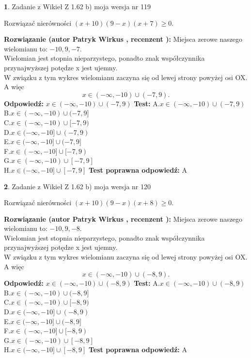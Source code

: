 \documentclass[12pt, a4paper]{article}
\theoremstyle{definition} %
\newtheorem{zad}{}
\newcommand{\zadStart}[1]{\begin{zad}#1\newline}
\newcommand{\zadStop}{\end{zad}}
\newcommand{\rozwStart}[2]{\noindent \textbf{Rozwiązanie (autor #1 , recenzent #2): }\newline}
\newcommand{\rozwStop}{\newline}
\newcommand{\odpStart}{\noindent \textbf{Odpowiedź:}\newline}
\newcommand{\odpStop}{\newline}
\newcommand{\testStart}{\noindent \textbf{Test:}\newline}
\newcommand{\testStop}{\newline}
\newcommand{\kluczStart}{\noindent \textbf{Test poprawna odpowiedź:}\newline}
\newcommand{\kluczStop}{\newline}
\begin{document}
\zadStart{Zadanie z Wikieł Z 1.62 b) moja wersja nr 119}

Rozwiązać nierówności $(x+10)(9-x)(x+7)\ge0$.
\zadStop
\rozwStart{Patryk Wirkus}{}
Miejsca zerowe naszego wielomianu to: $-10, 9, -7$.\\
Wielomian jest stopnia nieparzystego, ponadto znak współczynnika przy\linebreak najwyższej potędze x jest ujemny.\\ W związku z tym wykres wielomianu zaczyna się od lewej strony powyżej osi OX. A więc $$x \in (-\infty,-10) \cup (-7,9).$$
\rozwStop
\odpStart
$x \in (-\infty,-10) \cup (-7,9)$
\odpStop
\testStart
A.$x \in (-\infty,-10) \cup (-7,9)$\\
B.$x \in (-\infty,-10) \cup (-7,9]$\\
C.$x \in (-\infty,-10) \cup [-7,9)$\\
D.$x \in (-\infty,-10] \cup (-7,9)$\\
E.$x \in (-\infty,-10] \cup (-7,9]$\\
F.$x \in (-\infty,-10] \cup [-7,9)$\\
G.$x \in (-\infty,-10) \cup [-7,9]$\\
H.$x \in (-\infty,-10] \cup [-7,9]$
\testStop
\kluczStart
A
\kluczStop



\zadStart{Zadanie z Wikieł Z 1.62 b) moja wersja nr 120}

Rozwiązać nierówności $(x+10)(9-x)(x+8)\ge0$.
\zadStop
\rozwStart{Patryk Wirkus}{}
Miejsca zerowe naszego wielomianu to: $-10, 9, -8$.\\
Wielomian jest stopnia nieparzystego, ponadto znak współczynnika przy\linebreak najwyższej potędze x jest ujemny.\\ W związku z tym wykres wielomianu zaczyna się od lewej strony powyżej osi OX. A więc $$x \in (-\infty,-10) \cup (-8,9).$$
\rozwStop
\odpStart
$x \in (-\infty,-10) \cup (-8,9)$
\odpStop
\testStart
A.$x \in (-\infty,-10) \cup (-8,9)$\\
B.$x \in (-\infty,-10) \cup (-8,9]$\\
C.$x \in (-\infty,-10) \cup [-8,9)$\\
D.$x \in (-\infty,-10] \cup (-8,9)$\\
E.$x \in (-\infty,-10] \cup (-8,9]$\\
F.$x \in (-\infty,-10] \cup [-8,9)$\\
G.$x \in (-\infty,-10) \cup [-8,9]$\\
H.$x \in (-\infty,-10] \cup [-8,9]$
\testStop
\kluczStart
A
\kluczStop
\end{document}
